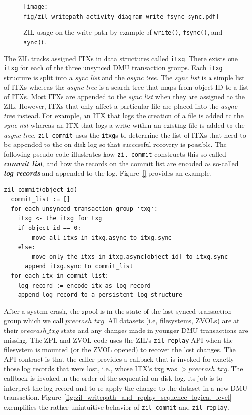\documentclass[12pt,a4paper,twoside]{book}
\begin{document}
\begin{figure}[H]
    \centering
    \texttt{[image: fig/zil\_writepath\_activity\_diagram\_write\_fsync\_sync.pdf]}
    \caption{
        ZIL usage on the write path by example of \lstinline{write()}, \lstinline{fsync()}, and \lstinline{sync()}.
    }
    \label{fig:zil_api_syscall_activity_diagrams}
\end{figure}

The ZIL tracks assigned ITXs in data structures called \lstinline{itxg}.
There exists one \lstinline{itxg} for each of the three unsynced DMU transaction groups.
Each \lstinline{itxg} structure is split into a \textit{sync list} and the \textit{async tree}.
The \textit{sync list} is a simple list of ITXs whereas the \textit{async tree} is a search-tree that maps from object ID to a list of ITXs.
Most ITXs are appended to the \textit{sync list} when they are assigned to the ZIL.
However, ITXs that only affect a particular file are placed into the \textit{async tree} instead.
For example, an ITX that logs the creation of a file is added to the \textit{sync list} whereas an ITX that logs a write within an existing file is added to the \textit{async tree}.
\lstinline{zil_commit} uses the \lstinline{itxg}s to determine the list of ITXs that need to be appended to the on-disk log so that successful recovery is possible.
The following pseudo-code illustrates how \lstinline{zil_commit} constructs this so-called \textit{\textbf{commit list}}, and how the records on the commit list are encoded as so-called \textit{\textbf{log records}} and appended to the log.
Figure~\ref{} provides an example.

\begin{lstlisting}[style=figurepseudocode]
zil_commit(object_id)
  commit_list := []
  for each unsynced transaction group 'txg':
    itxg <- the itxg for txg
    if object_id == 0:
        move all itxs in itxg.async to itxg.sync
    else:
        move only the itxs in itxg.async[object_id] to itxg.sync
      append itxg.sync to commit_list
  for each itx in commit_list:
    log_record := encode itx as log record
    append log record to a persistent log structure
\end{lstlisting}

After a system crash, the zpool is in the state of the last synced transaction group which we call $precrash\_txg$.
All datasets (i.e, filesystems, ZVOLs) are at their $precrash\_txg$ state and any changes made in younger DMU transactions are missing.
The ZPL and ZVOL code uses the ZIL's \lstinline{zil_replay} API when the filesystem is mounted (or the ZVOL opened) to recover the lost changes.
The API contract is that the caller provides a callback that is invoked for exactly those log records that were lost, i.e., whose ITX's txg was $> precrash\_txg$.
The callback is invoked in the order of the sequential on-disk log.
Its job is to interpret the log record and to re-apply the change to the dataset in a new DMU transaction.
Figure~\ref{fig:zil_writepath_and_replay_sequence_logical_level} exemplifies the rather unintuitive behavior of \lstinline{zil_commit} and \lstinline{zil_replay}.
\end{document}
